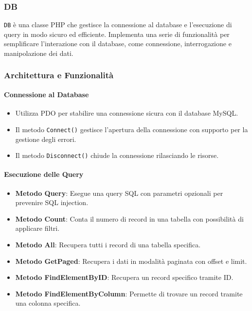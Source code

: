 \subsubsection{DB}
\texttt{DB} \`e una classe PHP che gestisce la connessione al database e l'esecuzione di query in modo sicuro ed efficiente. Implementa una serie di funzionalit\`a per semplificare l'interazione con il database, come connessione, interrogazione e manipolazione dei dati.

\subsubsection{Architettura e Funzionalit\`a}

\paragraph{Connessione al Database}
\begin{itemize}
    \item Utilizza PDO per stabilire una connessione sicura con il database MySQL.
    \item Il metodo \texttt{Connect()} gestisce l'apertura della connessione con supporto per la gestione degli errori.
    \item Il metodo \texttt{Disconnect()} chiude la connessione rilasciando le risorse.
\end{itemize}

\paragraph{Esecuzione delle Query}
\begin{itemize}
    \item \textbf{Metodo Query}: Esegue una query SQL con parametri opzionali per prevenire SQL injection.
    \item \textbf{Metodo Count}: Conta il numero di record in una tabella con possibilit\`a di applicare filtri.
    \item \textbf{Metodo All}: Recupera tutti i record di una tabella specifica.
    \item \textbf{Metodo GetPaged}: Recupera i dati in modalit\`a paginata con offset e limit.
    \item \textbf{Metodo FindElementByID}: Recupera un record specifico tramite ID.
    \item \textbf{Metodo FindElementByColumn}: Permette di trovare un record tramite una colonna specifica.
\end{itemize}


